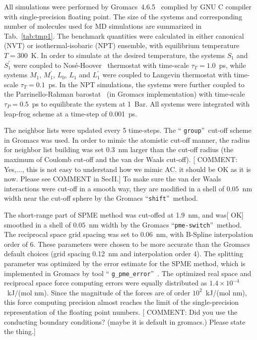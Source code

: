 \documentclass[a4paper,preprint,unsortedaddress,onecolumn,fleqn]{revtex4}
\begin{document}
All simulations were performed by Gromacs~4.6.5~\cite{hess2008gromacs,
pronk2013gromacs} complied by GNU C compiler with single-precision floating
point. The size of the systems and corresponding number of molecules used
for MD simulations are summarized in Tab.~\ref{tab:tmp1}. The benchmark
quantities were calculated in either canonical (NVT) or isothermal-isobaric
(NPT) ensemble, with equilibrium temperature $T=300$~K. In order to simulate
at the desired temperature, the systems $S_{1}$ and $S_{1}^{\prime }$ were
coupled to Nos\'{e}-Hoover~\cite{nose1984molecular,hoover1985canonical}
thermostat with time-scale $\tau _{T}=1.0$~ps, while systems $M_{1}$, $%
M_{1}^{\prime }$, $L_{0}$, $L_{1}$ and $L_{1}^{\prime }$ were coupled to
Langevin thermostat with time-scale $\tau _{T}=0.1$~ps. In the NPT
simulations, the systems were further coupled to the Parrinello-Rahman
barostat~\cite{parrinello1980crystal,parrinello1981polymorphic} (in Gromacs
implementation) with time-scale $\tau _{P}=0.5$~ps to equilibrate the system
at 1~Bar. All systems were integrated with leap-frog scheme at a time-step
of 0.001~ps.

The neighbor lists were updated every 5 time-steps. The \textquotedblleft 
\texttt{group}\textquotedblright\ cut-off scheme in Gromacs was used. In
order to mimic the atomistic cut-off manner, the radius for neighbor list
building was set 0.3~nm larger than the cut-off radius (the maximum of
Coulomb cut-off and the van der Waals cut-off). [ {\color{blue} COMMENT:
Yes,..., this is not easy to understand how we mimic AC. {\color{red} it
should be OK as it is now.}} {\color{blue} Please see COMMENT in SecII.}] To
make sure the van der Waals interactions were cut-off in a smooth way, they
are modified in a shell of $0.05$~nm width near the cut-off sphere by the
Gromacs \textquotedblleft \texttt{shift}\textquotedblright\ method.

The short-range part of SPME method {\color{red} was cut-offed at 1.9~nm,
and was}[ {\color{blue} OK] }smoothed in a shell of $0.05$~nm width by the
Gromacs \textquotedblleft \texttt{pme-switch}\textquotedblright\ method. The
reciprocal space grid spacing was set to 0.06~nm, with B-Spline
interpolation order of 6. These parameters were chosen to be more accurate
than the Gromacs default choices (grid spacing 0.12~nm and interpolation
order 4). The splitting parameter was optimized by the error estimate for
the SPME method, which is implemented in Gromacs by tool \textquotedblleft 
\texttt{g\_pme\_error}\textquotedblright ~\cite{wang2010optimizing}. The
optimized real space and reciprocal space force computing errors were
equally distributed as $1.4\times 10^{-4}$~kJ/(mol nm). Since the magnitude
of the forces are of order $10^{2}$~kJ/(mol nm), this force computing
precision almost reaches the limit of the single-precision representation of
the floating point numbers. [ {\color{blue} COMMENT: Did you use the
conducting boundary conditions? (maybe it is default in gromacs.) Please
state the thing.}]
\end{document}
